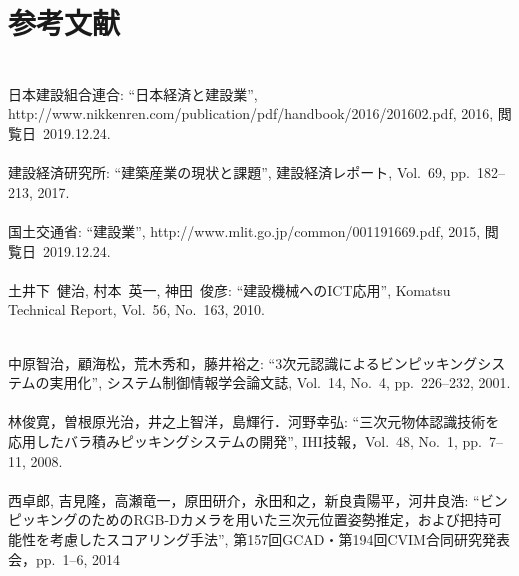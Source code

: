 \chapter*{参考文献}
\lhead[参考文献]{}
\thispagestyle{empty}

\newpage

\subsection*{}
\begin{mythebibliography}{}

\leavevmode \\日本建設組合連合:
\newblock ``日本経済と建設業'',
\newblock http://www.nikkenren.com/publication/pdf/handbook/2016/201602.pdf, 2016, 閲覧日~2019.12.24.
\\

\leavevmode \\建設経済研究所:
\newblock ``建築産業の現状と課題'',
\newblock 建設経済レポート, Vol.~69, pp.~182--213, 2017.
\\
\leavevmode \\国土交通省:
\newblock ``建設業'',
\newblock http://www.mlit.go.jp/common/001191669.pdf, 2015, 閲覧日~2019.12.24.
\\
\leavevmode \\土井下~健治, 村本~英一, 神田~俊彦:
\newblock ``建設機械へのICT応用'',
\newblock Komatsu Technical Report, Vol.~56, No.~163, 2010.
\\
\newpage

\leavevmode \\中原智治，顧海松，荒木秀和，藤井裕之:
\newblock ``3次元認識によるビンピッキングシステムの実用化'',
\newblock システム制御情報学会論文誌, Vol.~14, No.~4, pp.~226--232, 2001.
\\
\leavevmode \\林俊寛，曽根原光治，井之上智洋，島輝行．河野幸弘:
\newblock ``三次元物体認識技術を応用したバラ積みピッキングシステムの開発'',
\newblock IHI技報，Vol.~48, No.~1, pp.~7--11, 2008.
\\
\leavevmode \\西卓郎, 吉見隆，高瀬竜一，原田研介，永田和之，新良貴陽平，河井良浩:
\newblock ``ビンピッキングのためのRGB-Dカメラを用いた三次元位置姿勢推定，および把持可能性を考慮したスコアリング手法'',
\newblock 第157回GCAD・第194回CVIM合同研究発表会，pp.~1--6, 2014
\\


\end{mythebibliography}
